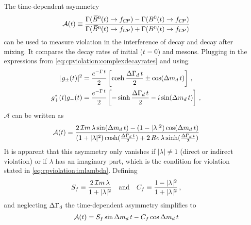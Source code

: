 The time-dependent asymmetry
\begin{equation}
  {\mathcal A}(t) \equiv
    \frac{\Gamma({{\kern 0.18em\overline{\kern -0.18em B}{}}{}^0}(t) \rightarrow f_{{C\!P}}) - \Gamma({{B}^0}(t) \rightarrow f_{{C\!P}})}
         {\Gamma({{\kern 0.18em\overline{\kern -0.18em B}{}}{}^0}(t) \rightarrow f_{{C\!P}}) + \Gamma({{B}^0}(t) \rightarrow f_{{C\!P}})}
\label{eq:cpviolation:asymmetry}
\end{equation}
can be used to measure \CP violation in the interference of decay and decay
after mixing. It compares the decay rates of initial ($t = 0$) \Bdb and \Bd
mesons. Plugging in the expressions from
\cref{eq:cpviolation:complexdecayrates} and using
\begin{align}
\begin{split}
  |g_{\pm}(t)|^2 &= \frac{e^{-\Gamma\,t}}{2}\left[\cosh\frac{{\Delta\Gamma_{{d}}}\,t}{2} \pm \cos({\Delta m_{{d}}}\,t)\right]\,,\\
  g_+^{\ast}(t)g_-(t) &= \frac{e^{-\Gamma\,t}}{2} \left[-\sinh\frac{{\Delta\Gamma_{{d}}}\,t}{2} - i \sin({\Delta m_{{d}}}\,t)\right]\,,
\end{split}
\end{align}
$\mathcal{A}$ can be written as
\begin{align}
  \mathcal{A}(t) = \frac{2\,\mathcal{I}m\,\lambda \sin({\Delta m_{{d}}}\,t) - (1 - |\lambda|^2)\cos({\Delta m_{{d}}}\,t)}{(1 + |\lambda|^2)\cosh(\frac{{\Delta\Gamma_{{d}}}\,t}{2}) + 2\,Re\,\lambda \sinh(\frac{{\Delta\Gamma_{{d}}}\,t}{2})}
\end{align}
It is apparent that this asymmetry only vanishes if $|\lambda| \neq 1$ (direct
or indirect \CP violation) or if $\lambda$ has an imaginary part, which is the
condition for \CP violation stated in \cref{eq:cpviolation:imlambda}. Defining
\begin{align}
  S_{f} = \frac{2\,\mathcal{I}m\,\lambda}{1 + |\lambda|^2} \quad \text{and} \quad C_{f} = \frac{1 - |\lambda|^2}{1 + |\lambda|^2}\,,
\label{eq:cpviolation:SfCf_general}
\end{align}
and neglecting ${\Delta\Gamma_{{d}}}$ the time-dependent asymmetry simplifies to
\begin{equation}
  \mathcal{A}(t) = S_{f}\sin{\ensuremath{\Delta m_{{d}}}}\,t - C_{f}\cos{\ensuremath{\Delta m_{{d}}}}\,t
\label{eq:cpviolation:simpleasymmetry}
\end{equation}
